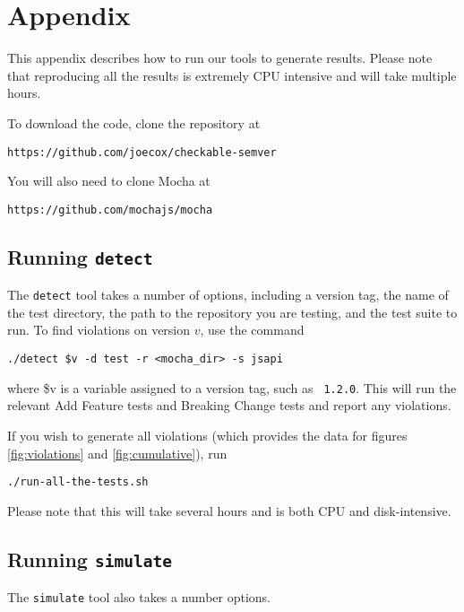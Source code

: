 \section{Appendix}
This appendix describes how to run our tools to generate
results. Please note that reproducing all the results is extremely
CPU intensive and will take multiple hours.

To download the code, clone the repository at
\begin{center}
  {\tt https://github.com/joecox/checkable-semver}
\end{center}

You will also need to clone Mocha at
\begin{center}
  {\tt https://github.com/mochajs/mocha}
\end{center}

\subsection{Running {\large {\tt detect}}}

The {\tt detect} tool takes a number of options, including a version
tag, the name of the test directory, the path to the repository you
are testing, and the test suite to run. To find violations on version
$v$, use the command

\begin{center}
  {\tt ./detect \$v -d test -r <mocha\_dir> -s jsapi}
\end{center}
where \$v is a variable assigned to a version tag, such as {\tt
  1.2.0}. This will run the relevant Add Feature tests and Breaking
Change tests and report any violations.

If you wish to generate all violations (which provides the data for
figures \ref{fig:violations} and \ref{fig:cumulative}), run

\begin{center}
  {\tt ./run-all-the-tests.sh}
\end{center}
Please note that this will take several hours and is both CPU and
disk-intensive.

\subsection{Running {\large {\tt simulate}}}

The {\tt simulate} tool also takes a number options.
